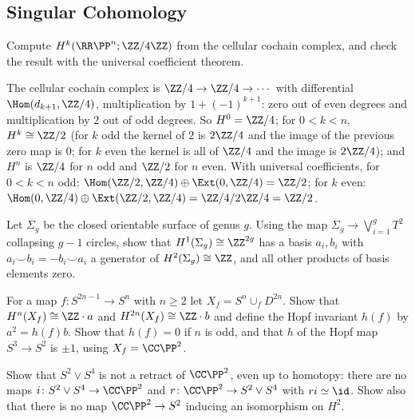 \subsection{Singular Cohomology}\label{singular-homology:subsection-exercises-singular-cohomology}

\begin{exercise}\label{singular-homology:exercise-uct-rp}
Compute $H^k(\RR\PP^n; \ZZ/4\ZZ)$ from the cellular cochain complex, and check the result with the universal coefficient theorem.
\end{exercise}

\begin{solution}
The cellular cochain complex is $\ZZ/4 \to \ZZ/4 \to \cdots$ with differential $\Hom(d_{k+1}, \ZZ/4)$, multiplication by $1 + (-1)^{k+1}$: zero out of even degrees and
multiplication by $2$ out of odd degrees. So $H^0 = \ZZ/4$; for $0 < k < n$, $H^k \cong \ZZ/2$ (for $k$ odd the kernel of $2$ is $2\ZZ/4$ and the image of the previous zero map is
$0$; for $k$ even the kernel is all of $\ZZ/4$ and the image is $2\ZZ/4$); and $H^n$ is $\ZZ/4$ for $n$ odd and $\ZZ/2$ for $n$ even. With universal coefficients, for
$0 < k < n$ odd: $\Hom(\ZZ/2, \ZZ/4) \oplus \Ext(0, \ZZ/4) = \ZZ/2$; for $k$ even: $\Hom(0, \ZZ/4) \oplus \Ext(\ZZ/2, \ZZ/4) = \ZZ/4/2\ZZ/4 = \ZZ/2$.
\end{solution}

\begin{exercise}\label{singular-homology:exercise-cup-torus}
Let $\Sigma_g$ be the closed orientable surface of genus $g$. Using the map $\Sigma_g \to \bigvee_{i=1}^g T^2$ collapsing $g - 1$ circles, show that $H^1(\Sigma_g) \cong \ZZ^{2g}$
has a basis $a_i, b_i$ with $a_i \smile b_i = -b_i \smile a_i$ a generator of $H^2(\Sigma_g) \cong \ZZ$, and all other products of basis elements zero.
\end{exercise}

\begin{exercise}\label{singular-homology:exercise-hopf-invariant}
For a map $f \colon S^{2n-1} \to S^n$ with $n \geq 2$ let $X_f = S^n \cup_f D^{2n}$. Show that $H^n(X_f) \cong \ZZ \cdot a$ and $H^{2n}(X_f) \cong \ZZ \cdot b$ and define the Hopf
invariant $h(f)$ by $a^2 = h(f)b$. Show that $h(f) = 0$ if $n$ is odd, and that $h$ of the Hopf map $S^3 \to S^2$ is $\pm 1$, using $X_f = \CC\PP^2$.
\end{exercise}

\begin{exercise}\label{singular-homology:exercise-retract-ring}
Show that $S^2 \vee S^4$ is not a retract of $\CC\PP^2$, even up to homotopy: there are no maps $i \colon S^2 \vee S^4 \to \CC\PP^2$ and $r \colon \CC\PP^2 \to S^2 \vee S^4$ with
$ri \simeq \id$. Show also that there is no map $\CC\PP^2 \to S^2$ inducing an isomorphism on $H^2$.
\end{exercise}


